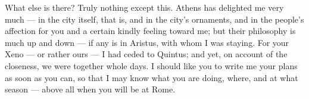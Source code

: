  What else is there? Truly nothing except this. Athens has delighted me very much --- in the city itself, that is, and in the city's ornaments, and in the people's affection for you and a certain kindly feeling toward me; \textdagger{}but their philosophy is much up and down\textdagger{} --- if any is in Aristus, with whom I was staying. For your Xeno --- or rather ours --- I had ceded to Quintus; and yet, on account of the closeness, we were together whole days. I should like you to write me your plans as soon as you can, so that I may know what you are doing, where, and at what season --- above all when you will be at Rome.
